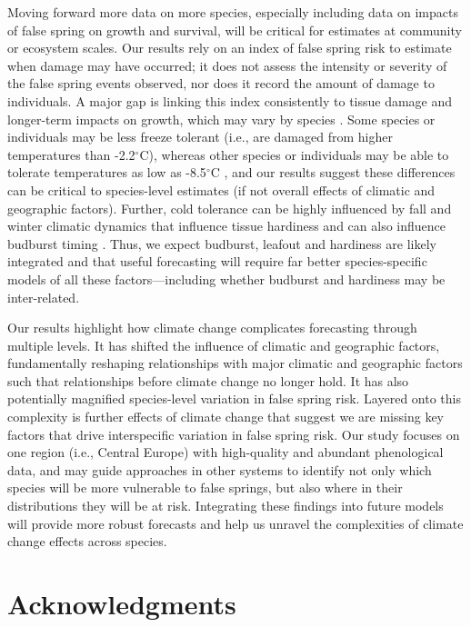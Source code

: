 \documentclass{article}\usepackage[]{graphicx}\usepackage[]{color}
\begin{document}
Moving forward more data on more species, especially including data on impacts of false spring on growth and survival, will be critical for estimates at community or ecosystem scales. Our results rely on an index of false spring risk to estimate when damage may have occurred; it does not assess the intensity or severity of the false spring events observed, nor does it record the amount of damage to individuals. A major gap is linking this index consistently to tissue damage and longer-term impacts on growth, which may vary by species \citep{Lenz2013,Korner2016,bennett2018globtherm,Zhuo2018}. Some species or individuals may be less freeze tolerant (i.e., are damaged from higher temperatures than -2.2$^{\circ}$C), whereas other species or individuals may be able to tolerate temperatures as low as -8.5$^{\circ}$C \citep{Lenz2016}, and our results suggest these differences can be critical to species-level estimates (if not overall effects of climatic and geographic factors). Further, cold tolerance can be highly influenced by fall and winter climatic dynamics that influence tissue hardiness \citep{Charrier2011, Vitasse2014,Hofmann2015} and can also influence budburst timing \citep{Morin2007}. Thus, we expect budburst, leafout and hardiness are likely integrated and that useful forecasting will require far better species-specific models of all these factors---including whether budburst and hardiness may be inter-related. 

Our results highlight how climate change complicates forecasting through multiple levels. It has shifted the influence of climatic and geographic factors, fundamentally reshaping relationships with major climatic and geographic factors such that relationships before climate change no longer hold. It has also potentially magnified species-level variation in false spring risk. Layered onto this complexity is further effects of climate change that suggest we are missing key factors that drive interspecific variation in false spring risk. Our study focuses on one region (i.e., Central Europe) with high-quality and abundant phenological data, and may guide approaches in other systems to identify not only which species will be more vulnerable to false springs, but also where in their distributions they will be at risk. Integrating these findings into future models will provide more robust forecasts and help us unravel the complexities of climate change effects across species.

\section*{Acknowledgments}
\end{document}
